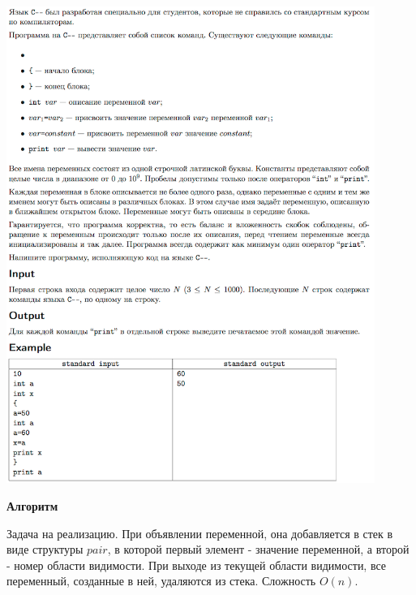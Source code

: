 \documentclass[a4paper,12pt]{article}
\begin{document}
\begin{center}
\includegraphics[width=0.9\textwidth]{OC_Europe/OC_Europe_N.png}\\ [1cm]
\end{center}

\textbf{{\large Алгоритм}}

Задача на реализацию. При объявлении переменной, она добавляется в стек в виде структуры $pair$, в которой первый элемент - значение переменной, а второй - номер области видимости. При выходе из текущей области видимости, все переменный, созданные в ней, удаляются из стека. Сложность $O(n)$.
\end{document}
